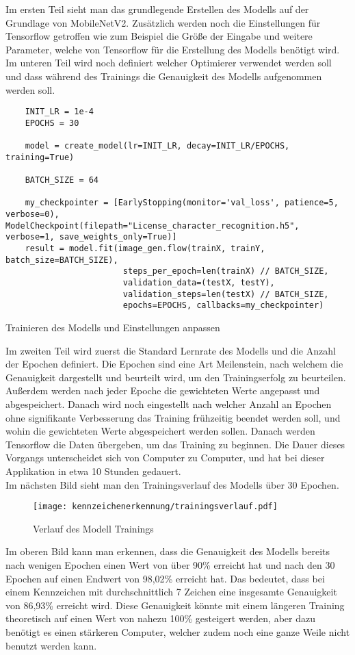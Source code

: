 Im ersten Teil sieht man das grundlegende Erstellen des Modells auf der Grundlage von MobileNetV2. Zusätzlich werden noch die Einstellungen für 
Tensorflow getroffen wie zum Beispiel die Größe der Eingabe und weitere Parameter, welche von Tensorflow für die Erstellung des Modells benötigt wird. 
Im unteren Teil wird noch definiert welcher Optimierer verwendet werden soll und dass während des Trainings die Genauigkeit des Modells aufgenommen werden soll.

\begin{longlisting}
    \begin{verbatim}
    INIT_LR = 1e-4
    EPOCHS = 30

    model = create_model(lr=INIT_LR, decay=INIT_LR/EPOCHS, training=True)

    BATCH_SIZE = 64

    my_checkpointer = [EarlyStopping(monitor='val_loss', patience=5, verbose=0), ModelCheckpoint(filepath="License_character_recognition.h5", verbose=1, save_weights_only=True)]
    result = model.fit(image_gen.flow(trainX, trainY, batch_size=BATCH_SIZE), 
                        steps_per_epoch=len(trainX) // BATCH_SIZE, 
                        validation_data=(testX, testY), 
                        validation_steps=len(testX) // BATCH_SIZE, 
                        epochs=EPOCHS, callbacks=my_checkpointer)
    \end{verbatim}
    \caption{Trainieren des Modells und Einstellungen anpassen}
\end{longlisting}

Im zweiten Teil wird zuerst die Standard Lernrate des Modells und die Anzahl der Epochen definiert. Die Epochen sind eine Art Meilenstein, 
nach welchem die Genauigkeit dargestellt und beurteilt wird, um den Trainingserfolg zu beurteilen. Außerdem werden nach jeder Epoche die gewichteten Werte 
angepasst und abgespeichert. Danach wird noch eingestellt nach welcher Anzahl an Epochen ohne signifikante Verbesserung das Training frühzeitig 
beendet werden soll, und wohin die gewichteten Werte abgespeichert werden sollen. Danach werden Tensorflow die Daten übergeben, um das Training 
zu beginnen. Die Dauer dieses Vorgangs unterscheidet sich von Computer zu Computer, und hat bei dieser Applikation in etwa 10 Stunden gedauert.\\

Im nächsten Bild sieht man den Trainingsverlauf des Modells über 30 Epochen.

\begin{figure}[H]
    \centering
    \texttt{[image: kennzeichenerkennung/trainingsverlauf.pdf]}
    \caption{Verlauf des Modell Trainings}
\end{figure}

Im oberen Bild kann man erkennen, dass die Genauigkeit des Modells bereits nach wenigen Epochen einen Wert von über 90\% erreicht hat und 
nach den 30 Epochen auf einen Endwert von 98,02\% erreicht hat. Das bedeutet, dass bei einem Kennzeichen mit durchschnittlich 7 Zeichen 
eine insgesamte Genauigkeit von 86,93\% erreicht wird. Diese Genauigkeit könnte mit einem längeren Training theoretisch auf einen Wert von 
nahezu 100\% gesteigert werden, aber dazu benötigt es einen stärkeren Computer, welcher zudem noch eine ganze Weile nicht benutzt werden kann.